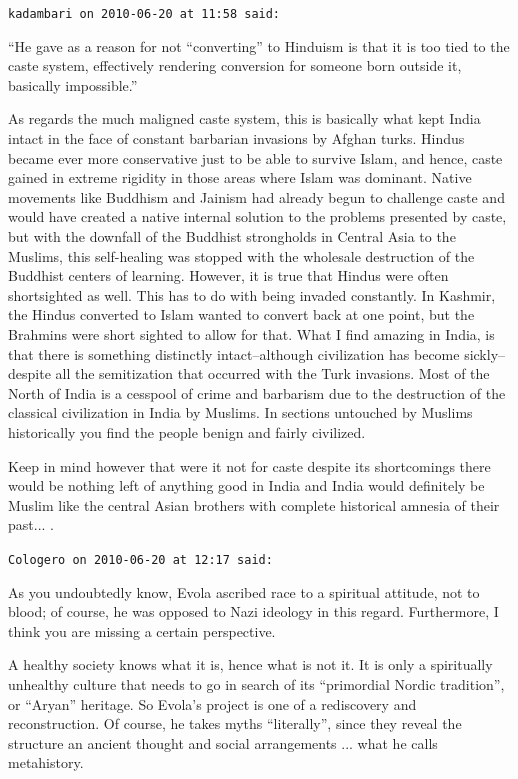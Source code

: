 \begin{footnotesize}
\begin{sffamily}
\hfill

\texttt{kadambari on 2010-06-20 at 11:58 said:}

``He gave as a reason for not ``converting'' to Hinduism is that it is too tied to the caste system, effectively rendering conversion for someone born outside it, basically impossible.''

As regards the much maligned caste system, this is basically what kept India intact in the face of constant barbarian invasions by Afghan turks. Hindus became ever more conservative just to be able to survive Islam, and hence, caste gained in extreme rigidity in those areas where Islam was dominant. Native movements like Buddhism and Jainism had already begun to challenge caste and would have created a native internal solution to the problems presented by caste, but with the downfall of the Buddhist strongholds in Central Asia to the Muslims, this self-healing was stopped with the wholesale destruction of the Buddhist centers of learning. However, it is true that Hindus were often shortsighted as well. This has to do with being invaded constantly. In Kashmir, the Hindus converted to Islam wanted to convert back at one point, but the Brahmins were short sighted to allow for that. What I find amazing in India, is that there is something distinctly intact--although civilization has become sickly--despite all the semitization that occurred with the Turk invasions. Most of the North of India is a cesspool of crime and barbarism due to the destruction of the classical civilization in India by Muslims. In sections untouched by Muslims historically you find the people benign and fairly civilized.

Keep in mind however that were it not for caste despite its shortcomings there would be nothing left of anything good in India and India would definitely be Muslim like the central Asian brothers with complete historical amnesia of their past... .

\hfill

\texttt{Cologero on 2010-06-20 at 12:17 said:}

As you undoubtedly know, Evola ascribed race to a spiritual attitude, not to blood; of course, he was opposed to Nazi ideology in this regard. Furthermore, I think you are missing a certain perspective.

A healthy society knows what it is, hence what is not it. It is only a spiritually unhealthy culture that needs to go in search of its ``primordial Nordic tradition'', or ``Aryan'' heritage. So Evola's project is one of a rediscovery and reconstruction. Of course, he takes myths ``literally'', since they reveal the structure an ancient thought and social arrangements ... what he calls metahistory.


\end{sffamily}
\end{footnotesize}
